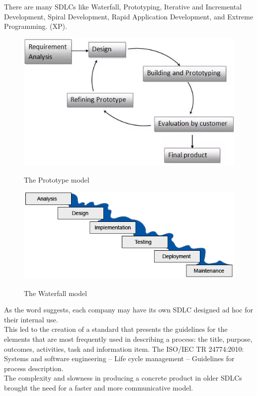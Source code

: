 There are many SDLCs like Waterfall, Prototyping, Iterative and Incremental Development, Spiral Development, Rapid Application Development, and Extreme Programming. (XP). 
\begin{figure}[H]
	\centering
	\includegraphics[width=.7\textwidth]{resources/prototype}\\
	\caption{The Prototype model}
\end{figure}
\begin{figure}[H]
	\centering
	\includegraphics[width=.7\textwidth]{resources/warterfall}\\
	\caption{The Waterfall model}
\end{figure}
As the word  suggests, each company may have its own SDLC designed ad hoc for their internal use.\\
This led to the creation of a standard that presents the guidelines for the elements that are most frequently used in describing a process: the title, purpose, outcomes, activities, task and information item.
The ISO/IEC TR 24774:2010: Systems and software engineering -- Life cycle management -- Guidelines for process description\cite{iso_53815}.\\
The complexity and slowness in producing a concrete product in older SDLCs brought the need for a faster and more communicative model.\\

